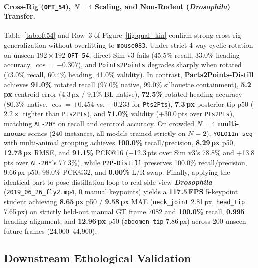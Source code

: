 \documentclass[10pt,twocolumn,letterpaper]{article}
\begin{document}
\paragraph{Cross-Rig (\texttt{OFT\_54}), $N=4$ Scaling, and Non-Rodent (\emph{Drosophila}) Transfer.} Table~\ref{tab:oft54} and Row~3 of Figure~\ref{fig:qual_kin} confirm strong cross-rig generalization without overfitting to \texttt{mouse083}. Under strict 4-way cyclic rotation on unseen $192\times 192$ \texttt{OFT\_54}, direct Sim v3 fails (45.5\% recall, 33.0\% heading accuracy, $\cos=-0.307$), and \texttt{Points2Points} degrades sharply when rotated (73.0\% recall, 60.4\% heading, 41.0\% validity). In contrast, \textbf{Parts2Points-Distill} achieves \textbf{91.0\%} rotated recall (97.0\% native, 99.0\% silhouette containment), \textbf{5.2\,px} centroid error (4.3\,px / 9.1\% BL native), \textbf{72.5\%} rotated heading accuracy (80.3\% native, $\cos=+0.454$ vs.\ $+0.233$ for \texttt{Pts2Pts}), \textbf{7.3\,px} posterior-tip p50 ($2.2\times$ tighter than \texttt{Pts2Pts}), and \textbf{71.0\%} validity (+30.0\,pts over \texttt{Pts2Pts}), matching \texttt{AL-20*} on recall and centroid accuracy. On crowded \textbf{$N=4$ multi-mouse} scenes (240 instances, all models trained strictly on $N=2$), \texttt{YOLO11n-seg} with multi-animal grouping achieves \textbf{100.0\%} recall/precision, \textbf{8.29\,px} p50, \textbf{12.73\,px} RMSE, and \textbf{91.1\%} PCK@16 (+12.3\,pts over Sim v3's 78.8\% and +13.8\,pts over \texttt{AL-20*}'s 77.3\%), while \texttt{P2P-Distill} preserves 100.0\% recall/precision, 9.66\,px p50, 98.0\% PCK@32, and \textbf{0.00\%} L/R swap. Finally, applying the identical part-to-pose distillation loop to real side-view \textbf{\emph{Drosophila}} (\texttt{2019\_06\_26\_fly2.mp4}, 0 manual keypoints) yields a \textbf{117.5\,FPS} 5-keypoint student achieving \textbf{8.65\,px} p50 / \textbf{9.58\,px} MAE (\texttt{neck\_joint} 2.81\,px, \texttt{head\_tip} 7.65\,px) on strictly held-out manual GT frame 7082 and \textbf{100.0\%} recall, \textbf{0.995} heading alignment, and \textbf{12.96\,px} p50 (\texttt{abdomen\_tip} 7.86\,px) across 200 unseen future frames (24,000--44,900).

\subsection{Downstream Ethological Validation}
\end{document}
